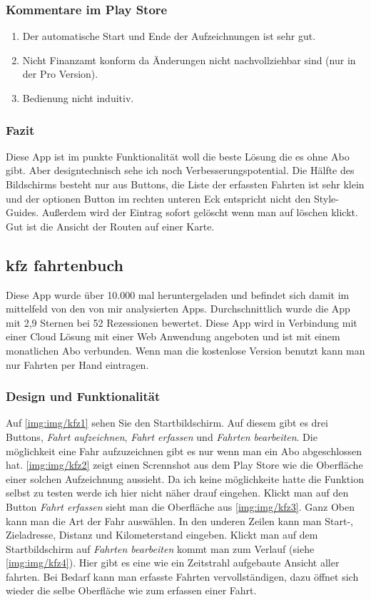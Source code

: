 \subsubsection{Kommentare im Play Store}
\begin{enumerate}
    \item Der automatische Start und Ende der Aufzeichnungen ist sehr gut.
    \item Nicht Finanzamt konform da Änderungen nicht nachvollziehbar sind (nur in der Pro Version).
    \item Bedienung nicht induitiv.
\end{enumerate}

\subsubsection{Fazit}
Diese App ist im punkte Funktionalität woll die beste Lösung die es ohne Abo gibt. Aber designtechnisch
sehe ich noch Verbesserungspotential. Die Hälfte des Bildschirms besteht nur aus Buttons, die Liste
der erfassten Fahrten ist sehr klein und der optionen Button im rechten unteren Eck entspricht nicht
den Style-Guides. Außerdem wird der Eintrag sofort gelöscht wenn man auf löschen klickt. Gut ist die
Ansicht der Routen auf einer Karte.

\subsection{kfz fahrtenbuch}
Diese App wurde über 10.000 mal heruntergeladen und befindet sich damit im mittelfeld von den von mir
analysierten Apps. Durchschnittlich wurde die App mit 2,9 Sternen bei 52 Rezessionen bewertet.
Diese App wird in Verbindung mit einer Cloud Lösung mit einer Web Anwendung angeboten und ist mit einem
monatlichen Abo verbunden. Wenn man die kostenlose Version benutzt kann man nur Fahrten per Hand eintragen.

\subsubsection{Design und Funktionalität}
Auf \ref{img:img/kfz1} sehen Sie den Startbildschirm. Auf diesem gibt es drei Buttons, \textit{Fahrt aufzeichnen},
\textit{Fahrt erfassen} und \textit{Fahrten bearbeiten}. Die möglichkeit eine Fahr aufzuzeichnen gibt es nur
wenn man ein Abo abgeschlossen hat. \ref{img:img/kfz2} zeigt einen Scrennshot aus dem Play Store wie die Oberfläche
einer solchen Aufzeichnung aussieht. Da ich keine möglichkeite hatte die Funktion selbst zu testen werde ich hier nicht
näher drauf eingehen. Klickt man auf den Button \textit{Fahrt erfassen} sieht man die Oberfläche aus \ref{img:img/kfz3}.
Ganz Oben kann man die Art der Fahr auswählen. In den underen Zeilen kann man Start-, Zieladresse, Distanz und Kilometerstand
eingeben. Klickt man auf dem Startbildschirm auf \textit{Fahrten bearbeiten} kommt man zum Verlauf (siehe \ref{img:img/kfz4}).
Hier gibt es eine wie ein Zeitstrahl aufgebaute Ansicht aller fahrten. Bei Bedarf kann man erfasste Fahrten vervollständigen,
dazu öffnet sich wieder die selbe Oberfläche wie zum erfassen einer Fahrt.

